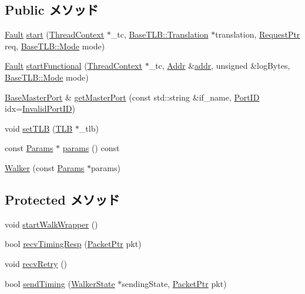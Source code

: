 \subsection*{Public メソッド}
\begin{DoxyCompactItemize}
\item 
\hyperlink{classRefCountingPtr}{Fault} \hyperlink{classX86ISA_1_1Walker_af431777dfd02888658d8bf01cc7ee789}{start} (\hyperlink{classThreadContext}{ThreadContext} $\ast$\_\-tc, \hyperlink{classBaseTLB_1_1Translation}{BaseTLB::Translation} $\ast$translation, \hyperlink{classRequest}{RequestPtr} req, \hyperlink{classBaseTLB_a46c8a310cf4c094f8c80e1cb8dc1f911}{BaseTLB::Mode} mode)
\item 
\hyperlink{classRefCountingPtr}{Fault} \hyperlink{classX86ISA_1_1Walker_ad0337e2c2472a149328d21cd4310165f}{startFunctional} (\hyperlink{classThreadContext}{ThreadContext} $\ast$\_\-tc, \hyperlink{base_2types_8hh_af1bb03d6a4ee096394a6749f0a169232}{Addr} \&\hyperlink{namespaceX86ISA_ab705917f60c5566f9ce56a93f798b2e2}{addr}, unsigned \&logBytes, \hyperlink{classBaseTLB_a46c8a310cf4c094f8c80e1cb8dc1f911}{BaseTLB::Mode} mode)
\item 
\hyperlink{classBaseMasterPort}{BaseMasterPort} \& \hyperlink{classX86ISA_1_1Walker_adc4e675e51defbdd1e354dac729d0703}{getMasterPort} (const std::string \&if\_\-name, \hyperlink{base_2types_8hh_acef4d7d41cb21fdc252e20c04cd7bb8e}{PortID} idx=\hyperlink{base_2types_8hh_a65bf40f138cf863f0c5e2d8ca1144126}{InvalidPortID})
\item 
void \hyperlink{classX86ISA_1_1Walker_a57c4132ed7eb199686bbcfb0de7722ac}{setTLB} (\hyperlink{classX86ISA_1_1TLB}{TLB} $\ast$\_\-tlb)
\item 
const \hyperlink{classX86ISA_1_1Walker_a55ceaa41cdace6176b677cc22eb01bf6}{Params} $\ast$ \hyperlink{classX86ISA_1_1Walker_acd3c3feb78ae7a8f88fe0f110a718dff}{params} () const 
\item 
\hyperlink{classX86ISA_1_1Walker_a9a124fc3abef67f86629216ab6699ec0}{Walker} (const \hyperlink{classX86ISA_1_1Walker_a55ceaa41cdace6176b677cc22eb01bf6}{Params} $\ast$params)
\end{DoxyCompactItemize}
\subsection*{Protected メソッド}
\begin{DoxyCompactItemize}
\item 
void \hyperlink{classX86ISA_1_1Walker_a5cbf57f9ccdc6270d898ddca6d54905a}{startWalkWrapper} ()
\item 
bool \hyperlink{classX86ISA_1_1Walker_a482dba5588f4bee43e498875a61e5e0b}{recvTimingResp} (\hyperlink{classPacket}{PacketPtr} pkt)
\item 
void \hyperlink{classX86ISA_1_1Walker_a29cb5a4f98063ce6e9210eacbdb35298}{recvRetry} ()
\item 
bool \hyperlink{classX86ISA_1_1Walker_ad26bf3182653f73846811f045dcaafb6}{sendTiming} (\hyperlink{classX86ISA_1_1Walker_1_1WalkerState}{WalkerState} $\ast$sendingState, \hyperlink{classPacket}{PacketPtr} pkt)
\end{DoxyCompactItemize}
